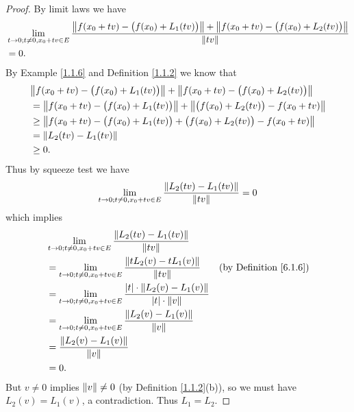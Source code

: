 \begin{proof}
    By limit laws we have
    \begin{align*}
         & \lim_{t \to 0 ; t \neq 0, x_0 + tv \in E} \frac{\norm*{f(x_0 + tv) - \big(f(x_0) + L_1(tv)\big)} + \norm*{f(x_0 + tv) - \big(f(x_0) + L_2(tv)\big)}}{\norm*{tv}} \\
         & = 0.
    \end{align*}
    By Example \ref{1.1.6} and Definition \ref{1.1.2} we know that
    \begin{align*}
         & \norm*{f(x_0 + tv) - \big(f(x_0) + L_1(tv)\big)} + \norm*{f(x_0 + tv) - \big(f(x_0) + L_2(tv)\big)}   \\
         & = \norm*{f(x_0 + tv) - \big(f(x_0) + L_1(tv)\big)} + \norm*{\big(f(x_0) + L_2(tv)\big) - f(x_0 + tv)} \\
         & \geq \norm*{f(x_0 + tv) - \big(f(x_0) + L_1(tv)\big) + \big(f(x_0) + L_2(tv)\big) - f(x_0 + tv)}      \\
         & = \norm*{L_2(tv) - L_1(tv)}                                                                           \\
         & \geq 0.
    \end{align*}
    Thus by squeeze test we have
    \[
        \lim_{t \to 0 ; t \neq 0, x_0 + tv \in E} \frac{\norm*{L_2(tv) - L_1(tv)}}{\norm*{tv}} = 0
    \]
    which implies
    \begin{align*}
         & \lim_{t \to 0 ; t \neq 0, x_0 + tv \in E} \frac{\norm*{L_2(tv) - L_1(tv)}}{\norm*{tv}}                                                                   \\
         & = \lim_{t \to 0 ; t \neq 0, x_0 + tv \in E} \frac{\norm*{t L_2(v) - t L_1(v)}}{\norm*{tv}}                          & \text{(by Definition \ref{6.1.6})} \\
         & = \lim_{t \to 0 ; t \neq 0, x_0 + tv \in E} \frac{\abs*{t} \cdot \norm*{L_2(v) - L_1(v)}}{\abs*{t} \cdot \norm*{v}}                                      \\
         & = \lim_{t \to 0 ; t \neq 0, x_0 + tv \in E} \frac{\norm*{L_2(v) - L_1(v)}}{\norm*{v}}                                                                    \\
         & = \frac{\norm*{L_2(v) - L_1(v)}}{\norm*{v}}                                                                                                              \\
         & = 0.
    \end{align*}
    But \(v \neq 0\) implies \(\norm*{v} \neq 0\) (by Definition \ref{1.1.2}(b)), so we must have \(L_2(v) = L_1(v)\), a contradiction.
    Thus \(L_1 = L_2\).
\end{proof}

